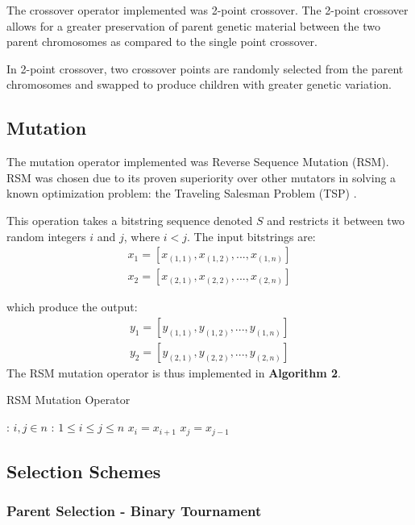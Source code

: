 \documentclass[conference]{IEEEtran}
\begin{document}
The crossover operator implemented was 2-point crossover. The 2-point crossover allows for a greater preservation of parent genetic material between the two parent chromosomes as compared to the single point crossover.

In 2-point crossover, two crossover points are randomly selected from the parent chromosomes and swapped to produce children with greater genetic variation.

\subsection{Mutation}

The mutation operator implemented was Reverse Sequence Mutation (RSM). RSM was chosen due to its proven superiority over other mutators in solving a known optimization problem: the Traveling Salesman Problem (TSP) \cite{RSM}.

This operation takes a bitstring sequence denoted $S$ and restricts it between two random integers $i$ and $j$, where $i < j$. The input bitstrings are:
\begin{align*}
x_{1} = [x_{(1,1)}, x_{(1,2)}, ..., x_{(1, n)}] \\
x_{2} = [x_{(2,1)}, x_{(2,2)}, ..., x_{(2, n)}]
\end{align*}

which produce the output:
\begin{align*}
y_{1} = [y_{(1,1)}, y_{(1,2)}, ..., y_{(1, n)}] \\
y_{2} = [y_{(2,1)}, y_{(2,2)}, ..., y_{(2, n)}]
\end{align*}
The RSM mutation operator is thus implemented in \textbf{Algorithm 2}.

\begin{algorithm}
\caption{RSM Mutation Operator}
\begin{algorithmic}
\REQUIRE: $i, j \in n$ 
\ENSURE: $1 \leq i \leq j \leq n$
\STATE $x_{i} = x_{i + 1}$
\STATE $x_{j} = x_{j - 1}$
\ENDWHILE
\end{algorithmic}
\end{algorithm}

\subsection{Selection Schemes}

\subsubsection{Parent Selection - Binary Tournament}
\end{document}
